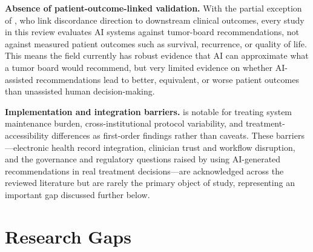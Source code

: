 \documentclass[acmsmall,screen=true,review=false,nonacm=true]{acmart}
\begin{document}
\textbf{Absence of patient-outcome-linked validation.} With the partial exception of \citet{aliyev2026}, who link discordance direction to downstream clinical outcomes, every study in this review evaluates AI systems against tumor-board recommendations, not against measured patient outcomes such as survival, recurrence, or quality of life. This means the field currently has robust evidence that AI can approximate what a tumor board would recommend, but very limited evidence on whether AI-assisted recommendations lead to better, equivalent, or worse patient outcomes than unassisted human decision-making.

\textbf{Implementation and integration barriers.} \citet{wu2026} is notable for treating system maintenance burden, cross-institutional protocol variability, and treatment-accessibility differences as first-order findings rather than caveats. These barriers---electronic health record integration, clinician trust and workflow disruption, and the governance and regulatory questions raised by using AI-generated recommendations in real treatment decisions---are acknowledged across the reviewed literature but are rarely the primary object of study, representing an important gap discussed further below.

\section{Research Gaps}
\label{sec:gaps}
\end{document}
